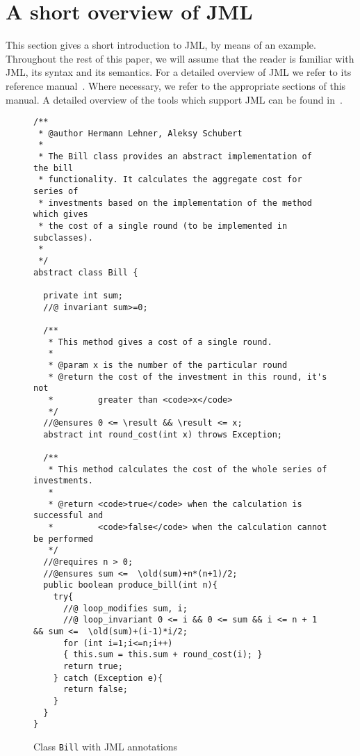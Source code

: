 \section{A short overview of JML}\label{SecJMLOverview}

This section gives a short introduction to JML, by means of an
example. Throughout the rest of this paper, we will assume that the
reader is familiar with JML, its syntax and its semantics. For a
detailed overview of JML we refer to its reference
manual~\cite{JMLReferenceManual05}. Where necessary, we refer to the
appropriate sections of this manual. A detailed overview of the tools
which support JML can be found in~\cite{BurdyCCEKLLP05}.

\begin{figure}[th!]
{\small
\begin{verbatim}
/**
 * @author Hermann Lehner, Aleksy Schubert
 *
 * The Bill class provides an abstract implementation of the bill
 * functionality. It calculates the aggregate cost for series of
 * investments based on the implementation of the method which gives 
 * the cost of a single round (to be implemented in subclasses).
 * 
 */
abstract class Bill {
  
  private int sum;
  //@ invariant sum>=0;
 
  /**
   * This method gives a cost of a single round.
   * 
   * @param x is the number of the particular round
   * @return the cost of the investment in this round, it's not
   *         greater than <code>x</code> 
   */ 
  //@ensures 0 <= \result && \result <= x;
  abstract int round_cost(int x) throws Exception;
  
  /**
   * This method calculates the cost of the whole series of investments.
   *
   * @return <code>true</code> when the calculation is successful and
   *         <code>false</code> when the calculation cannot be performed
   */
  //@requires n > 0;
  //@ensures sum <=  \old(sum)+n*(n+1)/2;
  public boolean produce_bill(int n){
    try{
      //@ loop_modifies sum, i;
      //@ loop_invariant 0 <= i && 0 <= sum && i <= n + 1 && sum <=  \old(sum)+(i-1)*i/2;
      for (int i=1;i<=n;i++) 
      { this.sum = this.sum + round_cost(i); }
      return true;
    } catch (Exception e){
      return false;
    }
  }
}
\end{verbatim}
}
\caption{Class \texttt{Bill} with JML annotations} 
\label{FigExampleJML}
\end{figure}

